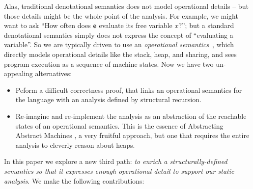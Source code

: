 Alas, traditional denotational semantics does not
model operational details -- but those details might be the whole point of the analysis.  For example,
we might want to ask ``How often does $\mathsf{e}$ evaluate its free variable $x$?'';
but a standard denotational semantics simply does not express the concept of ``evaluating a variable''.
So we are typically driven to use an \emph{operational semantics}~\citep{Plotkin:81}, which directly
models operational details like the stack, heap, and sharing, and sees program execution
as a sequence of machine states.  Now we have two un-appealing alternatives:
\begin{itemize}
\item Peform a difficult correctness proof, that links an operational semantics for the language
  with an analysis defined by structural recursion.
\item Re-imagine and re-implement the analysis as an abstraction of the
  reachable states of an operational semantics.
  This is the essence of Abstracting Abstract Machines \cite{aam}, a very
  fruitful approach, but one that requires the entire analysis to cleverly
  reason about heaps.
\end{itemize}
In this paper we explore a new third path: \emph{to enrich a structurally-defined semantics so that
it expresses enough operational detail to support our static analysis}.
We make the following contributions:
